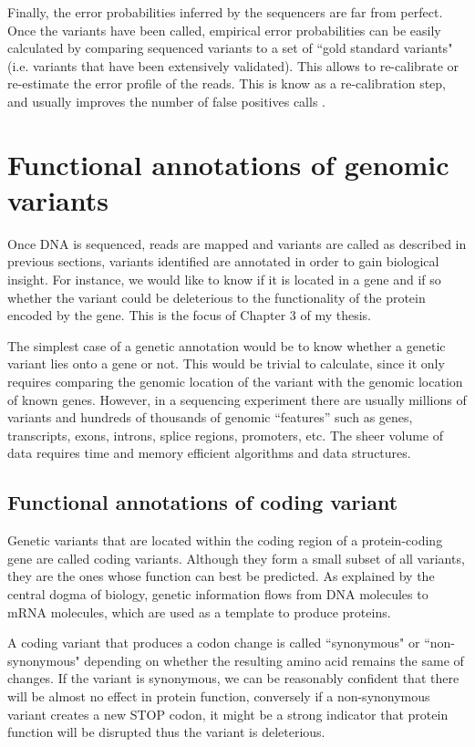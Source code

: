 Finally, the error probabilities inferred by the sequencers are far from perfect.  Once the variants have been called, empirical error probabilities can be easily calculated \cite{mckenna2010genome} by comparing sequenced variants to a set of ``gold standard variants" (i.e. variants that have been extensively validated).  This allows to re-calibrate or re-estimate the error profile of the reads.  This is know as a re-calibration step, and usually improves the number of false positives calls \cite{depristo2011framework}.

\section{Functional annotations of genomic variants}

Once DNA is sequenced, reads are mapped and variants are called as described in previous sections, variants identified are annotated in order to gain biological insight. For instance, we would like to know if it is located in a gene and if so whether the variant could be deleterious to the functionality of the protein encoded by the gene. This is the focus of Chapter 3 of my thesis.

The simplest case of a genetic annotation would be to know whether a genetic variant lies onto a gene or not. This would be trivial to calculate, since it only requires comparing the genomic location of the variant with the genomic location of known genes. However, in a sequencing experiment there are usually millions of variants and hundreds of thousands of genomic ``features'' such as genes, transcripts, exons, introns, splice regions, promoters, etc. The sheer volume of data requires time and memory efficient algorithms and data structures.

\subsection{Functional annotations of coding variant}

Genetic variants that are located within the coding region of a protein-coding gene are called coding variants. Although they form a small subset of all variants, they are the ones whose function can best be predicted.  As explained by the central dogma of biology, genetic information flows from DNA molecules to mRNA molecules, which are used as a template to produce proteins. 

A coding variant that produces a codon change is called ``synonymous" or ``non-synonymous" depending on whether the resulting amino acid remains the same of changes. If the variant is synonymous, we can be reasonably confident that there will be almost no effect in protein function, conversely if a non-synonymous variant creates a new STOP codon, it might be a strong indicator that protein function will be  disrupted thus the variant is deleterious.

